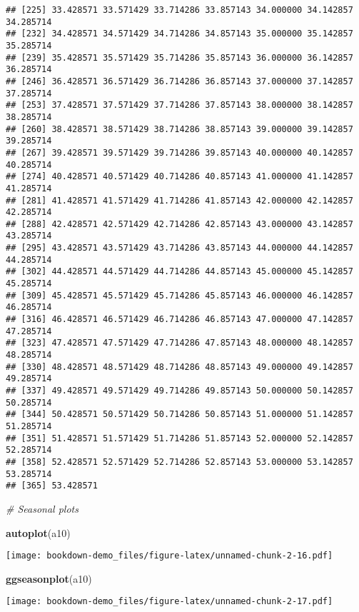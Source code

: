 \documentclass[]{book}
\newenvironment{Shaded}{\begin{snugshade}}{\end{snugshade}}
\newcommand{\CommentTok}[1]{\textcolor[rgb]{0.56,0.35,0.01}{\textit{#1}}}
\newcommand{\KeywordTok}[1]{\textcolor[rgb]{0.13,0.29,0.53}{\textbf{#1}}}
\newcommand{\NormalTok}[1]{#1}
\begin{document}
\begin{verbatim}
## [225] 33.428571 33.571429 33.714286 33.857143 34.000000 34.142857 34.285714
## [232] 34.428571 34.571429 34.714286 34.857143 35.000000 35.142857 35.285714
## [239] 35.428571 35.571429 35.714286 35.857143 36.000000 36.142857 36.285714
## [246] 36.428571 36.571429 36.714286 36.857143 37.000000 37.142857 37.285714
## [253] 37.428571 37.571429 37.714286 37.857143 38.000000 38.142857 38.285714
## [260] 38.428571 38.571429 38.714286 38.857143 39.000000 39.142857 39.285714
## [267] 39.428571 39.571429 39.714286 39.857143 40.000000 40.142857 40.285714
## [274] 40.428571 40.571429 40.714286 40.857143 41.000000 41.142857 41.285714
## [281] 41.428571 41.571429 41.714286 41.857143 42.000000 42.142857 42.285714
## [288] 42.428571 42.571429 42.714286 42.857143 43.000000 43.142857 43.285714
## [295] 43.428571 43.571429 43.714286 43.857143 44.000000 44.142857 44.285714
## [302] 44.428571 44.571429 44.714286 44.857143 45.000000 45.142857 45.285714
## [309] 45.428571 45.571429 45.714286 45.857143 46.000000 46.142857 46.285714
## [316] 46.428571 46.571429 46.714286 46.857143 47.000000 47.142857 47.285714
## [323] 47.428571 47.571429 47.714286 47.857143 48.000000 48.142857 48.285714
## [330] 48.428571 48.571429 48.714286 48.857143 49.000000 49.142857 49.285714
## [337] 49.428571 49.571429 49.714286 49.857143 50.000000 50.142857 50.285714
## [344] 50.428571 50.571429 50.714286 50.857143 51.000000 51.142857 51.285714
## [351] 51.428571 51.571429 51.714286 51.857143 52.000000 52.142857 52.285714
## [358] 52.428571 52.571429 52.714286 52.857143 53.000000 53.142857 53.285714
## [365] 53.428571
\end{verbatim}

\begin{Shaded}
\begin{Highlighting}[]
\CommentTok{# Seasonal plots }

  \KeywordTok{autoplot}\NormalTok{(a10)}
\end{Highlighting}
\end{Shaded}

\texttt{[image: bookdown-demo\_files/figure-latex/unnamed-chunk-2-16.pdf]}

\begin{Shaded}
\begin{Highlighting}[]
  \KeywordTok{ggseasonplot}\NormalTok{(a10)}
\end{Highlighting}
\end{Shaded}

\texttt{[image: bookdown-demo\_files/figure-latex/unnamed-chunk-2-17.pdf]}
\end{document}
